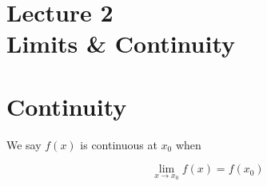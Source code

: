 

\section*{\centering Lecture 2 \\
\bigbreak 
Limits \& Continuity}

\bigbreak
\section{Continuity}

We say $f(x)$ is continuous at $x_0$ when

\begin{equation*}
\lim_{x \to x_0} f(x) = f(x_0)
\end{equation*}